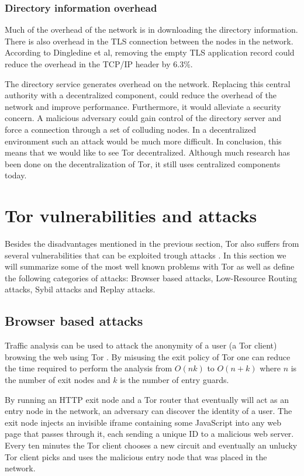 \documentclass{article}
\begin{document}
		\subsubsection{Directory information overhead}
			Much of the overhead of the network is in downloading the directory information. There is also overhead in the TLS connection between the nodes in the network. According to Dingledine et al, removing the empty TLS application record could reduce the overhead in the TCP/IP header by 6.3\%.

			The directory service generates overhead on the network. Replacing this central authority with a decentralized component, could reduce the overhead of the network and improve performance. Furthermore, it would alleviate a security concern. A malicious adversary could gain control of the directory server and force a connection through a set of colluding nodes. In a decentralized environment such an attack would be much more difficult. In conclusion, this means that we would like to see Tor decentralized. Although much research has been done on the decentralization of Tor, it still uses centralized components today.
		
\section{Tor vulnerabilities and attacks}
	\label{sec:attacks}
	
	Besides the disadvantages mentioned in the previous section, Tor also suffers from several vulnerabilities that can be exploited trough attacks \cite{abbott2007browser, douceur2002sybil, bauer2007low}. In this section we will summarize some of the most well known problems with Tor as well as define the following categories of attacks: Browser based attacks, Low-Resource Routing attacks, Sybil attacks and Replay attacks.

	\subsection{Browser based attacks}
		Traffic analysis can be used to attack the anonymity of a user (a Tor client) browsing the web using Tor \cite{abbott2007browser}. By misusing the exit policy of Tor one can reduce the time required to perform the analysis from $O(nk)$ to $O(n+k)$ where $n$ is the number of exit nodes and $k$ is the number of entry guards.

		By running an HTTP exit node and a Tor router that eventually will act as an entry node in the network, an adversary can discover the identity of a user. The exit node injects an invisible iframe containing some JavaScript into any web page that passes through it, each sending a unique ID to a malicious web server. Every ten minutes the Tor client chooses a new circuit and eventually an unlucky Tor client picks and uses the malicious entry node that was placed in the network.
\end{document}
